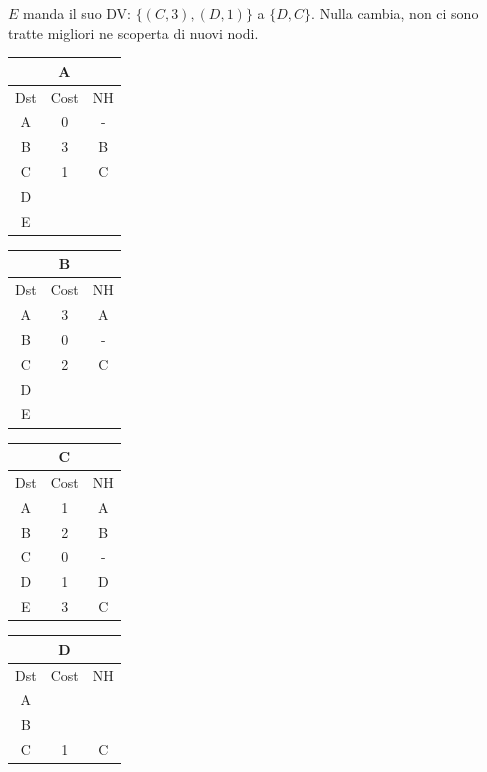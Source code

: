 \documentclass[10pt]{article}
\begin{document}
			\newline \newline \newline 
			$E$ manda il suo DV: $\{(C,3),(D,1)\}$ a $\{D,C\}$.
			\newline
			Nulla cambia, non ci sono tratte migliori ne scoperta di nuovi nodi.
			\begin{table}[h!]
				\begin{tabular}{|c||c||c|}
					\hline
					\multicolumn{3}{|c|}{A} \\
					\hline
					Dst & Cost & NH \\
					\hline
					A & 0 & - \\
					B & 3 & B \\
					C & 1 & C \\
					D &   &   \\
					E &   &   \\
					\hline
				\end{tabular}
				\begin{tabular}{|c||c||c|}
					\hline
					\multicolumn{3}{|c|}{B} \\
					\hline
					Dst & Cost & NH\\
					\hline
					A & 3 & A \\
					B & 0 & - \\
					C & 2 & C \\
					D &   &   \\
					E &   &   \\
					\hline
				\end{tabular}
				\begin{tabular}{|c||c||c|}
					\hline
					\multicolumn{3}{|c|}{C} \\
					\hline
					Dst & Cost & NH \\
					\hline
					A & 1 & A \\
					B & 2 & B \\
					C & 0 & - \\
					D & 1 & D \\
					E & 3 & C \\
					\hline
				\end{tabular}
				\begin{tabular}{|c||c||c|}
					\hline
					\multicolumn{3}{|c|}{D} \\
					\hline
					Dst & Cost & NH \\
					\hline
					A &   &   \\
					B &   &   \\
					C & 1 & C \\

\end{tabular}
\end{table}
\end{document}
